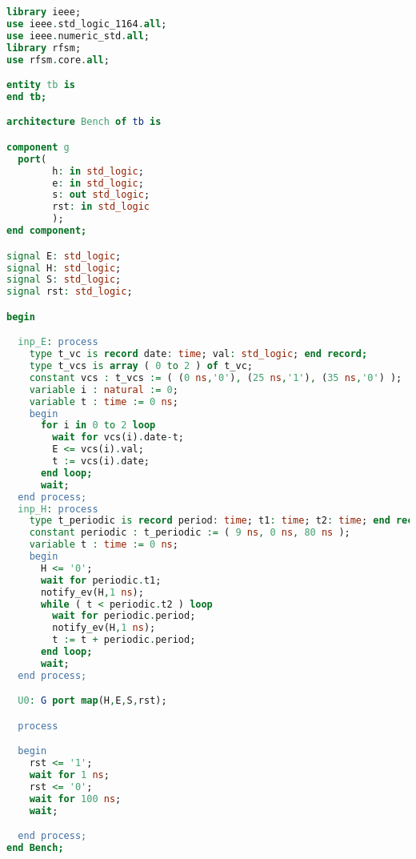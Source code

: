 \begin{lstlisting}[language=VHDL,frame=single,numbers=none,basicstyle=\small,caption=File tb.vhd]
library ieee;
use ieee.std_logic_1164.all;	   
use ieee.numeric_std.all;
library rfsm;
use rfsm.core.all;

entity tb is
end tb;

architecture Bench of tb is

component g 
  port(
        h: in std_logic;
        e: in std_logic;
        s: out std_logic;
        rst: in std_logic
        );
end component;

signal E: std_logic;
signal H: std_logic;
signal S: std_logic;
signal rst: std_logic;

begin

  inp_E: process
    type t_vc is record date: time; val: std_logic; end record;
    type t_vcs is array ( 0 to 2 ) of t_vc;
    constant vcs : t_vcs := ( (0 ns,'0'), (25 ns,'1'), (35 ns,'0') );
    variable i : natural := 0;
    variable t : time := 0 ns;
    begin
      for i in 0 to 2 loop
        wait for vcs(i).date-t;
        E <= vcs(i).val;
        t := vcs(i).date;
      end loop;
      wait;
  end process;
  inp_H: process
    type t_periodic is record period: time; t1: time; t2: time; end record;
    constant periodic : t_periodic := ( 9 ns, 0 ns, 80 ns );
    variable t : time := 0 ns;
    begin
      H <= '0';
      wait for periodic.t1;
      notify_ev(H,1 ns);
      while ( t < periodic.t2 ) loop
        wait for periodic.period;
        notify_ev(H,1 ns);
        t := t + periodic.period;
      end loop;
      wait;
  end process;

  U0: G port map(H,E,S,rst);

  process

  begin
    rst <= '1';
    wait for 1 ns;
    rst <= '0';
    wait for 100 ns;
    wait;

  end process;
end Bench;
\end{lstlisting}

